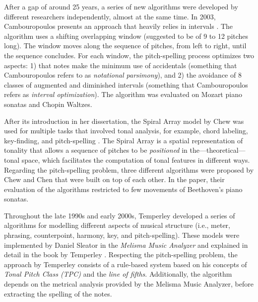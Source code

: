 After a gap of around 25 years, a series of new algorithms were developed by different researchers independently, almost at the same time. In 2003, Cambouropoulos presents an approach that heavily relies in intervals \cite{cambouropoulos_pitch_2003}. The algorithm uses a shifting overlapping window (suggested to be of 9 to 12 pitches long). The window moves along the sequence of pitches, from left to right, until the sequence concludes. For each window, the pitch-spelling process optimizes two aspects: 1) that notes make the minimum use of accidentals (something that Cambouropoulos refers to as \emph{notational parsimony}), and 2) the avoidance of 8 classes of augmented and diminished intervals (something that Cambouropoulos refers as \emph{interval optimization}). The algorithm was evaluated on Mozart piano sonatas and Chopin Waltzes.

After its introduction in her dissertation, the Spiral Array model by Chew was used for multiple tasks that involved tonal analysis, for example, chord labeling, key-finding, and pitch-spelling \cite{chew_towards_2000}. The Spiral Array is a spatial representation of tonality that allows a sequence of pitches to be \emph{positioned} in the---theoretical---tonal space, which facilitates the computation of tonal features in different ways. Regarding the pitch-spelling problem, three different algorithms were proposed by Chew and Chen \cite{chew_determining_2003} that were built on top of each other. In the paper, their evaluation of the algorithms restricted to few movements of Beethoven's piano sonatas.

Throughout the late 1990s and early 2000s, Temperley developed a series of algorithms for modelling different aspects of musical structure (i.e., meter, phrasing, counterpoint, harmony, key, and pitch-spelling). These models were implemented by Daniel Sleator in the \emph{Melisma Music Analyzer} and explained in detail in the book by Temperley \cite{temperley_cognition_2004}. Respecting the pitch-spelling problem, the approach by Temperley consists of a rule-based system based on his concepts of \emph{Tonal Pitch Class (TPC)} and the \emph{line of fifths}. Additionally, the algorithm depends on the metrical analysis provided by the Melisma Music Analyzer, before extracting the spelling of the notes.

